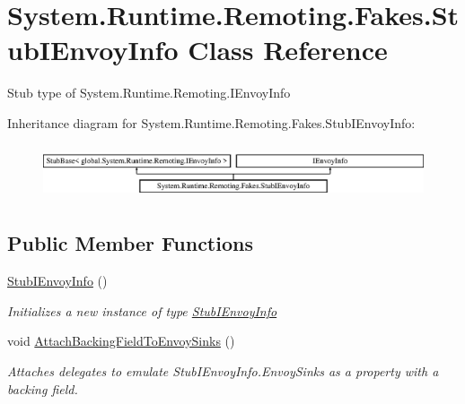 \hypertarget{class_system_1_1_runtime_1_1_remoting_1_1_fakes_1_1_stub_i_envoy_info}{\section{System.\-Runtime.\-Remoting.\-Fakes.\-Stub\-I\-Envoy\-Info Class Reference}
\label{class_system_1_1_runtime_1_1_remoting_1_1_fakes_1_1_stub_i_envoy_info}
}


Stub type of System.\-Runtime.\-Remoting.\-I\-Envoy\-Info 


Inheritance diagram for System.\-Runtime.\-Remoting.\-Fakes.\-Stub\-I\-Envoy\-Info\-:\begin{figure}[H]
\begin{center}
\leavevmode
\includegraphics[height=1.637427cm]{class_system_1_1_runtime_1_1_remoting_1_1_fakes_1_1_stub_i_envoy_info}
\end{center}
\end{figure}
\subsection*{Public Member Functions}
\begin{DoxyCompactItemize}
\item 
\hyperlink{class_system_1_1_runtime_1_1_remoting_1_1_fakes_1_1_stub_i_envoy_info_aabcfc1ea2556a9bcf785e03449920139}{Stub\-I\-Envoy\-Info} ()
\begin{DoxyCompactList}\small\item\em Initializes a new instance of type \hyperlink{class_system_1_1_runtime_1_1_remoting_1_1_fakes_1_1_stub_i_envoy_info}{Stub\-I\-Envoy\-Info}\end{DoxyCompactList}\item 
void \hyperlink{class_system_1_1_runtime_1_1_remoting_1_1_fakes_1_1_stub_i_envoy_info_a08a0a2806e6d30af79798405ffcb5971}{Attach\-Backing\-Field\-To\-Envoy\-Sinks} ()
\begin{DoxyCompactList}\small\item\em Attaches delegates to emulate Stub\-I\-Envoy\-Info.\-Envoy\-Sinks as a property with a backing field.\end{DoxyCompactList}\end{DoxyCompactItemize}
